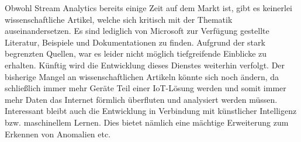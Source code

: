 Obwohl Stream Analytics bereits einige Zeit auf dem Markt ist, gibt es keinerlei wissenschaftliche Artikel, welche sich kritisch mit der Thematik auseinandersetzen. Es sind lediglich von Microsoft zur Verfügung gestellte Literatur, Beispiele und Dokumentationen zu finden. Aufgrund der stark begrenzten Quellen, war es leider nicht möglich tiefgreifende Einblicke zu erhalten. Künftig wird die Entwicklung dieses Dienstes weiterhin verfolgt. Der bisherige Mangel an wissenschaftlichen Artikeln könnte sich noch ändern, da schließlich immer mehr Geräte Teil einer IoT-Lösung werden und somit immer mehr Daten das Internet förmlich überfluten und analysiert werden müssen. Interessant bleibt auch die Entwicklung in Verbindung mit künstlicher Intelligenz bzw. maschinellem Lernen. Dies bietet nämlich eine mächtige Erweiterung zum Erkennen von Anomalien etc.
 

%

\ifCLASSOPTIONcaptionsoff
  \newpage
\fi